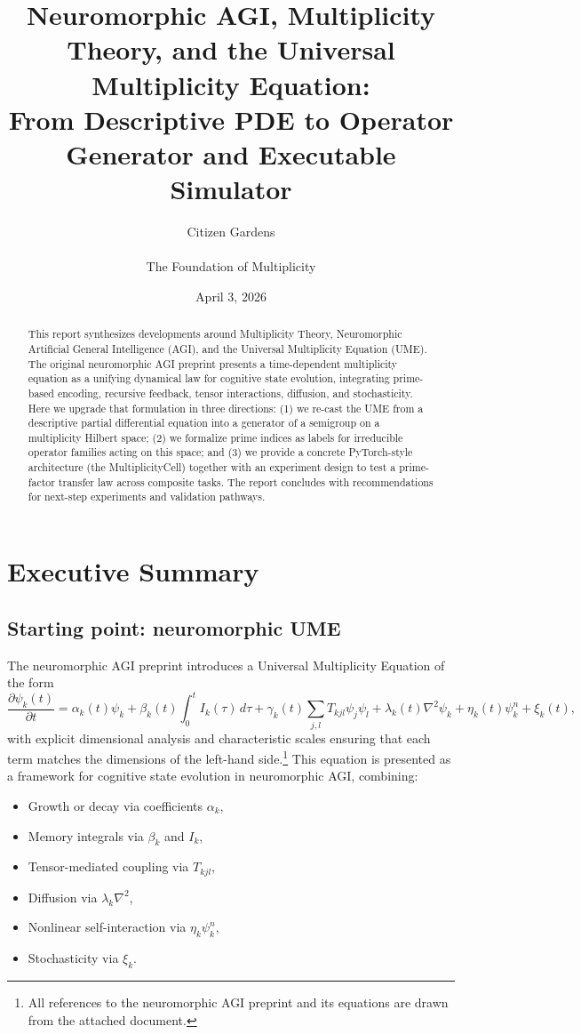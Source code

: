 \documentclass[11pt]{article}
\title{Neuromorphic AGI, Multiplicity Theory, and the Universal Multiplicity Equation:\\
From Descriptive PDE to Operator Generator and Executable Simulator}
\author{Citizen Gardens \\ \\ The Foundation of Multiplicity}
\date{April 3, 2026}
\begin{document}
\maketitle

\begin{abstract}
This report synthesizes developments around Multiplicity Theory, Neuromorphic Artificial General Intelligence (AGI), and the Universal Multiplicity Equation (UME). The original neuromorphic AGI preprint presents a time-dependent multiplicity equation as a unifying dynamical law for cognitive state evolution, integrating prime-based encoding, recursive feedback, tensor interactions, diffusion, and stochasticity. Here we upgrade that formulation in three directions: (1) we re-cast the UME from a descriptive partial differential equation into a generator of a semigroup on a multiplicity Hilbert space; (2) we formalize prime indices as labels for irreducible operator families acting on this space; and (3) we provide a concrete PyTorch-style architecture (the MultiplicityCell) together with an experiment design to test a prime-factor transfer law across composite tasks. The report concludes with recommendations for next-step experiments and validation pathways.
\end{abstract}

\tableofcontents

\section{Executive Summary}

\subsection{Starting point: neuromorphic UME}

The neuromorphic AGI preprint introduces a Universal Multiplicity Equation of the form
\begin{equation}
\frac{\partial \psi_k(t)}{\partial t}
= \alpha_k(t)\psi_k
+ \beta_k(t)\int_0^t I_k(\tau)\,d\tau
+ \gamma_k(t)\sum_{j,l} T_{kjl}\psi_j\psi_l
+ \lambda_k(t)\nabla^2\psi_k
+ \eta_k(t)\psi_k^n
+ \xi_k(t),
\label{eq:UME-coordinate}
\end{equation}
with explicit dimensional analysis and characteristic scales ensuring that each term matches the dimensions of the left-hand side.\footnote{All references to the neuromorphic AGI preprint and its equations are drawn from the attached document.} This equation is presented as a framework for cognitive state evolution in neuromorphic AGI, combining:
\begin{itemize}[nosep]
\item Growth or decay via coefficients $\alpha_k$,
\item Memory integrals via $\beta_k$ and $I_k$,
\item Tensor-mediated coupling via $T_{kjl}$,
\item Diffusion via $\lambda_k\nabla^2$,
\item Nonlinear self-interaction via $\eta_k\psi_k^n$,
\item Stochasticity via $\xi_k$.
\end{itemize}
\end{document}
